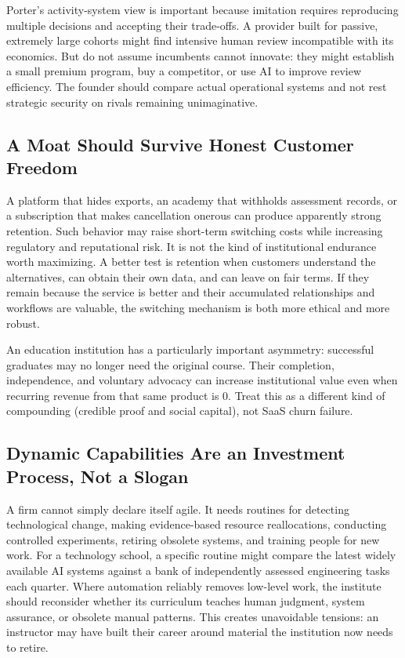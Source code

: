 Porter's activity-system view is important because imitation requires reproducing multiple decisions and accepting their trade-offs. A provider built for passive, extremely large cohorts might find intensive human review incompatible with its economics. But do not assume incumbents cannot innovate: they might establish a small premium program, buy a competitor, or use AI to improve review efficiency. The founder should compare actual operational systems and not rest strategic security on rivals remaining unimaginative.

\subsection{A Moat Should Survive Honest Customer Freedom}
\label{sec:moat_survive_customer_freedom}

A platform that hides exports, an academy that withholds assessment records, or a subscription that makes cancellation onerous can produce apparently strong retention. Such behavior may raise short-term switching costs while increasing regulatory and reputational risk. It is not the kind of institutional endurance worth maximizing. A better test is retention when customers understand the alternatives, can obtain their own data, and can leave on fair terms. If they remain because the service is better and their accumulated relationships and workflows are valuable, the switching mechanism is both more ethical and more robust.

An education institution has a particularly important asymmetry: successful graduates may no longer need the original course. Their completion, independence, and voluntary advocacy can increase institutional value even when recurring revenue from that same product is 0. Treat this as a different kind of compounding (credible proof and social capital), not SaaS churn failure.

\subsection{Dynamic Capabilities Are an Investment Process, Not a Slogan}
\label{sec:dynamic_capabilities_investment_process}

A firm cannot simply declare itself agile. It needs routines for detecting technological change, making evidence-based resource reallocations, conducting controlled experiments, retiring obsolete systems, and training people for new work. For a technology school, a specific routine might compare the latest widely available AI systems against a bank of independently assessed engineering tasks each quarter. Where automation reliably removes low-level work, the institute should reconsider whether its curriculum teaches human judgment, system assurance, or obsolete manual patterns. This creates unavoidable tensions: an instructor may have built their career around material the institution now needs to retire.

